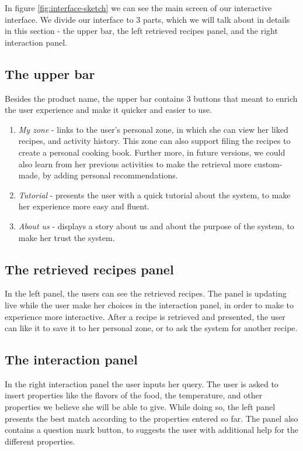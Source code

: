 \documentclass[]{article}
\begin{document}
In figure \ref{fig:interface-sketch} we can see the main screen of our interactive interface. We divide our interface to 3 parts, which we will talk about in details in this section - the upper bar, the left retrieved recipes panel, and the right interaction panel.

\subsection{The upper bar}
Besides the product name, the upper bar contains 3 buttons that meant to enrich the user experience and make it quicker and easier to use.
\begin{enumerate}
	\item \textit{My zone} - links to the user's personal zone, in which she can view her liked recipes, and activity history. This zone can also support filing the recipes to create a personal cooking book. Further more, in future versions, we could also learn from her previous activities to make the retrieval more custom-made, by adding personal recommendations.
	\item \textit{Tutorial} - presents the user with a quick tutorial about the system, to make her experience more easy and fluent.
	\item \textit{About us} - displays a story about us and about the purpose of the system, to make her trust the system.
\end{enumerate}

\subsection{The retrieved recipes panel}
In the left panel, the users can see the retrieved recipes. The panel is updating live while the user make her choices in the interaction panel, in order to make to experience more interactive. After a recipe is retrieved and presented, the user can like it to save it to her personal zone, or to ask the system for another recipe. 

\subsection{The interaction panel}
In the right interaction panel the user inputs her query. The user is asked to insert properties like the flavors of the food, the temperature, and other properties we believe she will be able to give. While doing so, the left panel presents the best match according to the properties entered so far. The panel also contains a question mark button, to suggests the user with additional help for the different properties.
\end{document}

